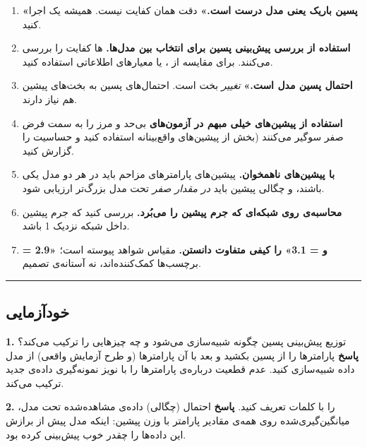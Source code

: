 \begin{enumerate}
\def\labelenumi{\arabic{enumi}.}
\tightlist
\item
  \textbf{«پسین باریک یعنی مدل درست است.»} دقت همان کفایت نیست. همیشه یک
   اجرا کنید.
\item
  \textbf{استفاده از بررسی پیش‌بینی پسین برای انتخاب بین مدل‌ها.}
  ها کفایت را بررسی می‌کنند. برای مقایسه از ،
   یا معیارهای اطلاعاتی استفاده کنید.
\item
  \textbf{ احتمال پسین مدل است.»} 
  \emph{تغییر} بخت است. احتمال‌های پسین به بخت‌های پیشین هم نیاز دارند.
\item
  \textbf{استفاده از پیشین‌های خیلی مبهم در آزمون‌های }
  بی‌حد و مرز  را به سمت فرض صفر سوگیر می‌کنند (بخش
   از پیشین‌های واقع‌بینانه استفاده کنید و حساسیت را گزارش کنید.
\item
  \textbf{ با پیشین‌های ناهمخوان.} پیشین‌های پارامترهای
  مزاحم  باید در هر دو مدل یکی باشند، و چگالی پیشین باید
  \emph{در مقدار صفر} تحت مدل بزرگ‌تر ارزیابی شود.
\item
  \textbf{محاسبه‌ی  روی شبکه‌ای که جرم پیشین را
  می‌بُرد.} بررسی کنید که جرم پیشین داخل شبکه نزدیک 1 باشد.
\item
  \textbf{ = 2.9» و  = 3.1» را کیفی متفاوت دانستن.}
  مقیاس شواهد پیوسته است؛ برچسب‌ها کمک‌کننده‌اند، نه آستانه‌ی تصمیم.
\end{enumerate}

\begin{center}\rule{0.5\linewidth}{0.5pt}\end{center}

\subsection{خودآزمایی}

\textbf{1.} توزیع پیش‌بینی پسین چگونه شبیه‌سازی می‌شود و چه چیزهایی را
ترکیب می‌کند؟ \textbf{پاسخ} پارامترها را از پسین بکشید و بعد با آن
پارامترها (و طرح آزمایش واقعی) از مدل داده شبیه‌سازی کنید. عدم قطعیت
درباره‌ی پارامترها را با نویز نمونه‌گیری داده‌ی جدید ترکیب می‌کند.

\textbf{2.}  را با کلمات تعریف کنید.
\textbf{پاسخ} احتمال (چگالی) داده‌ی مشاهده‌شده تحت مدل، میانگین‌گیری‌شده روی
همه‌ی مقادیر پارامتر با وزن پیشین: اینکه مدل پیش از برازش این داده‌ها را
چقدر خوب پیش‌بینی کرده بود.


